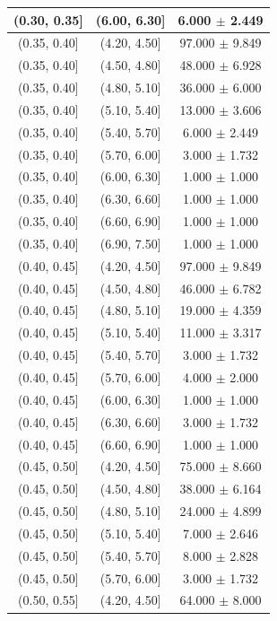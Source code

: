 \begin{longtable}{|c|c|c|}
\hline
(0.30, 0.35] & (6.00, 6.30] & 6.000 $\pm$ 2.449 \\ 
\hline
(0.35, 0.40] & (4.20, 4.50] & 97.000 $\pm$ 9.849 \\ 
\hline
(0.35, 0.40] & (4.50, 4.80] & 48.000 $\pm$ 6.928 \\ 
\hline
(0.35, 0.40] & (4.80, 5.10] & 36.000 $\pm$ 6.000 \\ 
\hline
(0.35, 0.40] & (5.10, 5.40] & 13.000 $\pm$ 3.606 \\ 
\hline
(0.35, 0.40] & (5.40, 5.70] & 6.000 $\pm$ 2.449 \\ 
\hline
(0.35, 0.40] & (5.70, 6.00] & 3.000 $\pm$ 1.732 \\ 
\hline
(0.35, 0.40] & (6.00, 6.30] & 1.000 $\pm$ 1.000 \\ 
\hline
(0.35, 0.40] & (6.30, 6.60] & 1.000 $\pm$ 1.000 \\ 
\hline
(0.35, 0.40] & (6.60, 6.90] & 1.000 $\pm$ 1.000 \\ 
\hline
(0.35, 0.40] & (6.90, 7.50] & 1.000 $\pm$ 1.000 \\ 
\hline
(0.40, 0.45] & (4.20, 4.50] & 97.000 $\pm$ 9.849 \\ 
\hline
(0.40, 0.45] & (4.50, 4.80] & 46.000 $\pm$ 6.782 \\ 
\hline
(0.40, 0.45] & (4.80, 5.10] & 19.000 $\pm$ 4.359 \\ 
\hline
(0.40, 0.45] & (5.10, 5.40] & 11.000 $\pm$ 3.317 \\ 
\hline
(0.40, 0.45] & (5.40, 5.70] & 3.000 $\pm$ 1.732 \\ 
\hline
(0.40, 0.45] & (5.70, 6.00] & 4.000 $\pm$ 2.000 \\ 
\hline
(0.40, 0.45] & (6.00, 6.30] & 1.000 $\pm$ 1.000 \\ 
\hline
(0.40, 0.45] & (6.30, 6.60] & 3.000 $\pm$ 1.732 \\ 
\hline
(0.40, 0.45] & (6.60, 6.90] & 1.000 $\pm$ 1.000 \\ 
\hline
(0.45, 0.50] & (4.20, 4.50] & 75.000 $\pm$ 8.660 \\ 
\hline
(0.45, 0.50] & (4.50, 4.80] & 38.000 $\pm$ 6.164 \\ 
\hline
(0.45, 0.50] & (4.80, 5.10] & 24.000 $\pm$ 4.899 \\ 
\hline
(0.45, 0.50] & (5.10, 5.40] & 7.000 $\pm$ 2.646 \\ 
\hline
(0.45, 0.50] & (5.40, 5.70] & 8.000 $\pm$ 2.828 \\ 
\hline
(0.45, 0.50] & (5.70, 6.00] & 3.000 $\pm$ 1.732 \\ 
\hline
(0.50, 0.55] & (4.20, 4.50] & 64.000 $\pm$ 8.000 \\ 

\end{longtable}
